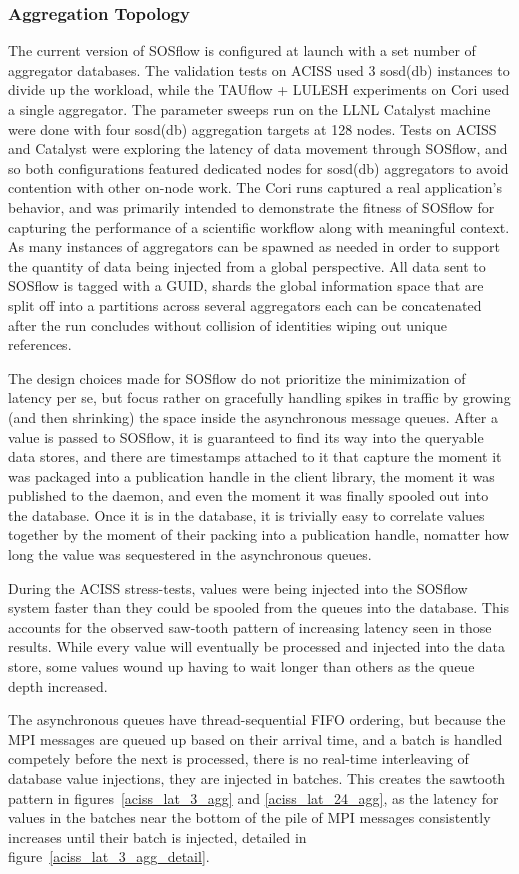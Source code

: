 \subsubsection{Aggregation Topology}
The current version of SOSflow is configured at launch with a set
number of aggregator databases.
%
The validation tests on ACISS used 3 sosd(db) instances to divide up
the workload, while the TAUflow + LULESH experiments on Cori used a
single aggregator.
%
The parameter sweeps run on the LLNL Catalyst machine were done with
four sosd(db) aggregation targets at 128 nodes.
%
Tests on ACISS and Catalyst were exploring the latency of data
movement through SOSflow, and so both configurations featured
dedicated nodes for sosd(db) aggregators to avoid contention
with other on-node work.
%
The Cori runs captured a real application's behavior, and was primarily
intended to demonstrate the fitness of SOSflow for capturing the
performance of a scientific workflow along with meaningful context.
%
As many instances of aggregators can be spawned as needed in order to
support the quantity of data being injected from a global
perspective.
%
All data sent to SOSflow is tagged with a GUID, shards the global
information space that are split off into a partitions across several
aggregators each can be concatenated after the run concludes without
collision of identities wiping out unique references.
%
%
\par
%
The design choices made for SOSflow do not prioritize the minimization
of latency per se, but focus rather on gracefully handling spikes in
traffic by growing (and then shrinking) the space inside the
asynchronous message queues.
%
After a value is passed to SOSflow, it is guaranteed to find its
way into the queryable data stores, and there are timestamps attached
to it that capture the moment it was packaged into a publication handle in
the client library, the moment it was published to the daemon, and
even the moment it was finally spooled out into the database.
%
Once it is in the database, it is trivially easy to correlate values
together by the moment of their packing into a publication handle, nomatter
how long the value was sequestered in the asynchronous queues.
%
\par
%
During the ACISS stress-tests, values were being injected into the
SOSflow system faster than they could be spooled from the queues into
the database.  This accounts for the observed saw-tooth pattern of
increasing latency seen in those results.
%
While every value will eventually be processed and injected into the data
store, some values wound up having to wait longer than others as the queue
depth increased.
%
\par
%
The asynchronous queues have thread-sequential FIFO ordering, but
because the MPI messages are queued up based on their arrival time,
and a batch is handled competely before the next is processed, there
is no real-time interleaving of database value injections, they are
injected in batches.
%
This creates the sawtooth pattern in figures~\ref{aciss_lat_3_agg} and
\ref{aciss_lat_24_agg}, as the latency for values in the batches near
the bottom of the pile of MPI messages consistently increases until
their batch is injected, detailed in
figure~\ref{aciss_lat_3_agg_detail}.
%
%


